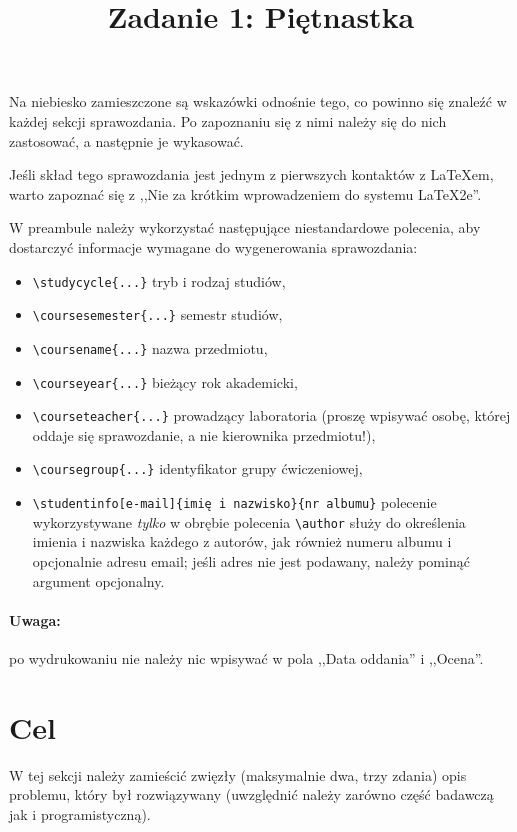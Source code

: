\documentclass{classrep}
\author{
  \studentinfo{Radosław Grela}{216769} \and
  \studentinfo{Jakub Wąchała}{216914}
}
\title{Zadanie 1: Piętnastka}
\begin{document}
\maketitle

{\color{blue}
Na niebiesko zamieszczone są wskazówki odnośnie tego, co powinno się znaleźć w
każdej sekcji sprawozdania. Po zapoznaniu się z nimi należy się do nich
zastosować, a następnie je wykasować.}

{\color{blue}
Jeśli skład tego sprawozdania jest jednym z pierwszych kontaktów z
\LaTeX\dywiz em, warto zapoznać się z ,,Nie za krótkim wprowadzeniem do systemu
\LaTeX2e''\cite{l2short}.}



{\color{blue}
W preambule należy wykorzystać następujące niestandardowe polecenia, aby
dostarczyć informacje wymagane do wygenerowania sprawozdania:
\begin{itemize}
    \item \verb+\studycycle{...}+ \ppauza tryb i rodzaj studiów,
    \item \verb+\coursesemester{...}+ \ppauza semestr studiów,
    \item \verb+\coursename{...}+ \ppauza nazwa przedmiotu,
    \item \verb+\courseyear{...}+ \ppauza bieżący rok akademicki,
    \item \verb+\courseteacher{...}+ \ppauza prowadzący laboratoria (proszę
    wpisywać osobę, której oddaje się sprawozdanie, a nie kierownika
    przedmiotu!),
    \item \verb+\coursegroup{...}+ \ppauza identyfikator grupy ćwiczeniowej,
    \item \verb+\studentinfo[e-mail]{imię i nazwisko}{nr albumu}+ \ppauza
    polecenie wykorzystywane \emph{tylko} w obrębie polecenia \verb+\author+
    służy do określenia imienia i nazwiska każdego z autorów, jak również
    numeru albumu i opcjonalnie adresu e\dywiz mail; jeśli adres nie jest
    podawany, należy pominąć argument opcjonalny.
\end{itemize}}

{\color{blue}
\paragraph{Uwaga:} po wydrukowaniu nie należy nic wpisywać w pola ,,Data
oddania'' i ,,Ocena''.}

\newpage
\section{Cel}
{\color{blue}
W tej sekcji należy zamieścić zwięzły (maksymalnie dwa, trzy zdania) opis
problemu, który był rozwiązywany (uwzględnić należy zarówno część badawczą jak
i programistyczną).}
\end{document}

